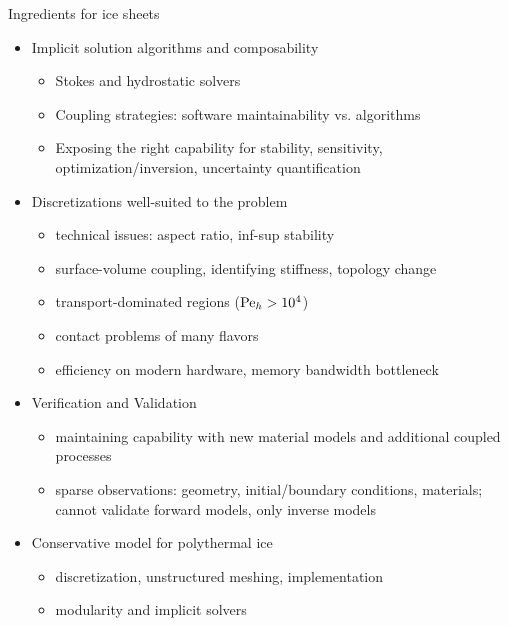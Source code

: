 \documentclass{beamer}
\begin{document}
\begin{frame}{Ingredients for ice sheets}
  \begin{itemize}
  \item Implicit solution algorithms and composability
    \begin{itemize}
    \item \alert<2>{Stokes and hydrostatic solvers}
    \item \alert<2>{Coupling strategies: software maintainability vs. algorithms}
    \item \alert<2>{Exposing the right capability for stability, sensitivity, optimization/inversion, uncertainty quantification}
    \end{itemize}
  \item Discretizations well-suited to the problem
    \begin{itemize}
    \item \alert<2>{technical issues: aspect ratio, inf-sup stability}
    \item \alert<2>{surface-volume coupling, identifying stiffness,} topology change
    \item transport-dominated regions (${\mathrm{Pe}}_h > 10^4$) 
    \item contact problems of many flavors
    \item \alert<2>{efficiency on modern hardware, memory bandwidth bottleneck}
    \end{itemize}
  \item Verification and Validation
    \begin{itemize}
    \item \alert<2>{maintaining capability with new material models and additional coupled processes}
    \item sparse observations: geometry, initial/boundary conditions, materials; cannot validate forward models, only inverse models
    \end{itemize}
  \item Conservative model for polythermal ice
    \begin{itemize}
    \item \alert<2>{discretization, unstructured meshing, implementation}
    \item \alert<2>{modularity and implicit solvers}
    \end{itemize}
  \end{itemize}
\end{frame}
\end{document}
